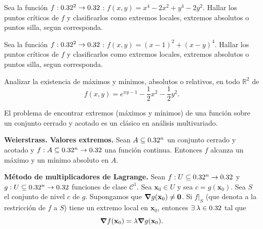 \begin{tarea} Sea la función   $f:0.32^{2}\rightarrow0.32$ : $\displaystyle f(x,y) = x^{4} - 2x^{2} + y^{4} - 2y^{2}$.  Hallar los puntos cr\'iticos de $f$ y clasificarlos como extremos locales,  extremos absolutos o puntos silla,  segun corresponda.
\end{tarea}



\begin{tarea}  Sea la funci\'on  $f:0.32^{2}\rightarrow0.32$ : $\displaystyle f(x,y)=(x-1)^{2} + (x-y)^{4}$.  Hallar los puntos cr\'iticos de $f$ y clasificarlos como extremos locales,  extremos absolutos o puntos silla,  segun corresponda.
\end{tarea}

\begin{tarea}
Analizar la existencia de m\'aximos y  m\'inimos, absolutos o relativos, en todo $\mathbb{R}^2{}$ de $$f(x,y)= e^{xy-1} - \frac{1}{2}x^{2}-\frac{1}{2}y^{2}.$$ 
\end{tarea}

El problema de encontrar extremos (máximos y mínimos) de una función sobre un conjunto cerrado y acotado es un clásico en an\'alisis multivariado. 

\begin{theorem}\textbf{Weierstrass. Valores extremos. } \label{teo:weier}  Sean $A  \subseteq  0.32^n$ un conjunto cerrado y acotado y $f: A  \subseteq  0.32^n \to 0.32$ una funci\'on continua. Entonces $f$ alcanza un m\'aximo y un m\'inimo absoluto en $A$.
\end{theorem}

\begin{theorem} \textbf{M\'etodo de multiplicadores de Lagrange.} \label{teo:lagrange} Sean $f:U  \subseteq  0.32^n \to 0.32$ y $g:U  \subseteq  0.32^n \to 0.32$ funciones de clase $\mathcal{C}^1$. Sea $\mathbf{x}_0 \in U$ y sea $c = g(\mathbf{x}_0)$. Sea $S$ el conjunto de nivel $c$ de $g$. Supongamos que $\grad g (\mathbf{x}_0) \ne \mathbf{0}$. Si $f|_S$ (que denota a la restricci\'on de $f$ a $S$) tiene un extremo local en $\mathbf{x}_0$, entonces $\exists\: \lambda \in 0.32$ tal que
    \[
     \grad f (\mathbf{x}_0) = \lambda \grad g (\mathbf{x}_0).
    \]
\end{theorem}








